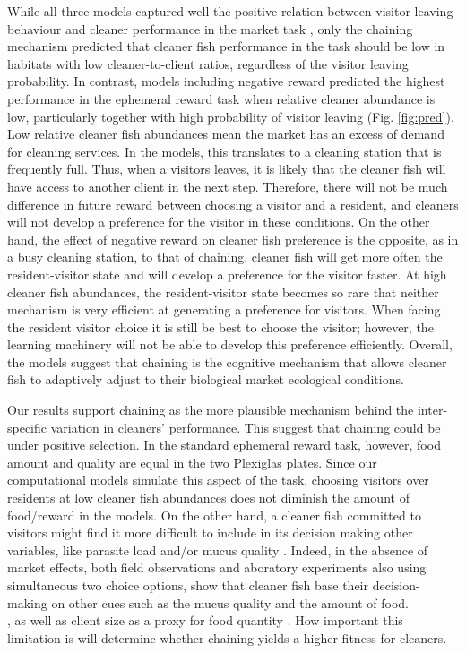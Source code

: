 \documentclass[]{rsos}%
\begin{document}
While all three models captured well the positive relation between visitor
leaving behaviour and cleaner performance in
the market task \citep{triki_Biological_2019}, only the chaining mechanism
predicted that cleaner fish performance in the task should be low in
habitats with low cleaner-to-client ratios, regardless of the
visitor leaving probability. In contrast, models including
negative reward predicted the highest performance in the ephemeral
reward task when relative cleaner abundance is low, particularly
together with high probability of visitor leaving (Fig. \ref{fig:pred}).
Low relative cleaner fish abundances mean the market has an excess of demand for
cleaning services. In the models, this translates to a cleaning station
that is frequently full. Thus, when a visitors leaves, it is likely that the
cleaner fish will have access to another client in the next step. Therefore,
there will not be much difference in future reward between choosing
a visitor and a resident, and cleaners will not develop a preference for the
visitor in these conditions. On the other hand, the effect of negative reward
on cleaner fish preference is the opposite, as in a busy cleaning station, to
that of chaining. cleaner fish will get more often the resident-visitor
state and will develop a preference for the visitor faster.
At high cleaner fish abundances, the resident-visitor state
becomes so rare that neither mechanism is very efficient
at generating a preference for visitors. When facing the resident
visitor choice it is still be best to choose the visitor; however,
the learning machinery will not be able to develop this preference
efficiently. Overall, the models suggest that chaining is the cognitive
mechanism that allows cleaner fish to adaptively adjust to their
biological market ecological conditions.

Our results support chaining as the more plausible mechanism behind the
inter-specific variation in cleaners' performance. This suggest
that chaining could be under positive selection. In the standard ephemeral
reward task, however, food amount and quality are equal in the
two Plexiglas plates. Since our computational models simulate this aspect of
the task, choosing visitors over residents at low cleaner fish abundances
does not diminish the amount of food/reward in the models.
On the other hand, a cleaner fish committed to visitors might find it more difficult
to include in its decision making other variables, like parasite load
and/or mucus quality \citep{roche_Client_2021}. Indeed, in the absence of
market effects, both field observations and aboratory experiments also
using simultaneous two choice options, show that cleaner fish base their
decision-making on other cues such as the mucus quality and the amount of food.\\
\citep{triki_Fluctuations_2019, grutter_Cleaner_2004}, as well as client size
as a proxy for food quantity \citep{wismer_Cuebased_2019, grutter_Does_2005}.
How important this limitation is will determine whether chaining yields a higher
fitness for cleaners.
\end{document}
